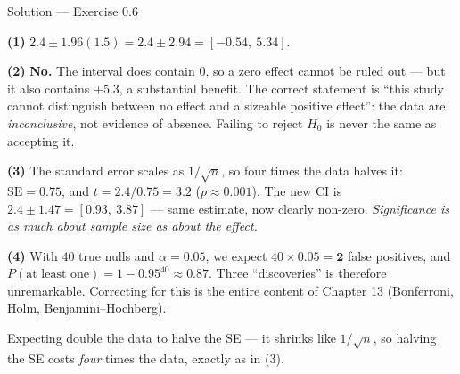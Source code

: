 \documentclass[aspectratio=169,11pt]{beamer}
\begin{document}
\begin{frame}{Solution --- Exercise 0.6}
  \begin{solutionbox}
    \textbf{(1)} $2.4 \pm 1.96(1.5) = 2.4 \pm 2.94 = [-0.54,\ 5.34]$.

    \textbf{(2)} \textbf{No.} The interval does contain $0$, so a zero effect
    cannot be ruled out --- but it also contains $+5.3$, a substantial
    benefit. The correct statement is ``this study cannot distinguish between
    no effect and a sizeable positive effect'': the data are
    \emph{inconclusive}, not evidence of absence. Failing to reject $H_0$ is
    never the same as accepting it.

    \textbf{(3)} The standard error scales as $1/\sqrt{n}$, so four times the
    data halves it: $\mathrm{SE} = 0.75$, and $t = 2.4/0.75 = 3.2$
    ($p \approx 0.001$). The new CI is $2.4 \pm 1.47 = [0.93,\ 3.87]$ ---
    same estimate, now clearly non-zero. \emph{Significance is as much about
    sample size as about the effect.}

    \textbf{(4)} With $40$ true nulls and $\alpha = 0.05$, we expect
    $40 \times 0.05 = \textbf{2}$ false positives, and $P(\text{at least
    one}) = 1 - 0.95^{40} \approx 0.87$. Three ``discoveries'' is therefore
    unremarkable. Correcting for this is the entire content of Chapter 13
    (Bonferroni, Holm, Benjamini--Hochberg).
  \end{solutionbox}
  \begin{mistake}
    Expecting double the data to halve the SE ---
    it shrinks like $1/\sqrt n$, so halving the SE costs \emph{four} times
    the data, exactly as in (3).
  \end{mistake}
\end{frame}
\end{document}
